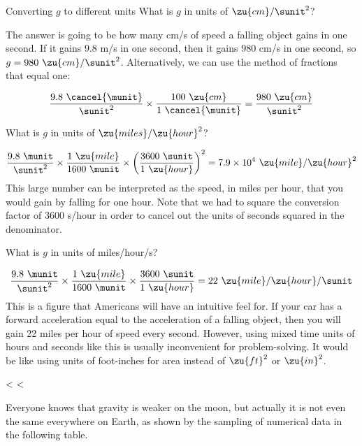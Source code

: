 \begin{eg}{Converting $g$ to different units}
\egquestion What is $g$ in units of $\zu{cm}/\sunit^2$?

\eganswer The answer is going to be how many cm/s of speed a
falling object gains in one second. If it gains 9.8 m/s in
one second, then it gains 980 cm/s in one second, so
$g=980\ \zu{cm}/\sunit^2$. Alternatively, we can use the method of
fractions that equal one:

\begin{equation*}
\frac{9.8\ \cancel{\munit}}{\sunit^2}\times\frac{100\ \zu{cm}}{1\ \cancel{\munit}}
  =\frac{980\ \zu{cm}}{\sunit^2}
\end{equation*}

\egquestion What is $g$ in units of $\zu{miles}/\zu{hour}^2$?

\eganswer

\begin{equation*}
\frac{9.8\ \munit}{\sunit^2} 
  \times \frac{1\ \zu{mile}}{1600\ \munit}
  \times \left(\frac{3600\ \sunit}{1\ \zu{hour}}\right)^2
  = 7.9\times 10^4\ \zu{mile}/\zu{hour}^2
\end{equation*}
This large number can be interpreted as the speed, in miles
per hour, that you would gain by falling for one hour. Note that
we had to square the conversion factor of 3600 s/hour in
order to cancel out the units of seconds squared in the denominator.

\egquestion What is $g$ in units of miles/hour/s?

\eganswer

\begin{equation*}
\frac{9.8\ \munit}{\sunit^2} 
  \times \frac{1\ \zu{mile}}{1600\ \munit}
  \times \frac{3600\ \sunit}{1\ \zu{hour}}
  = 22\ \zu{mile}/\zu{hour}/\sunit
\end{equation*}
This is a figure that Americans will have an intuitive feel
for. If your car has a forward acceleration equal to the
acceleration of a falling object, then you will gain 22
miles per hour of speed every second. However, using mixed
time units of hours and seconds like this is usually
inconvenient for problem-solving. It would be like using
units of foot-inches for area instead of $\zu{ft}^2$ or $\zu{in}^2$.
\end{eg}

<%
<%

Everyone knows that gravity is weaker on the moon, but
actually it is not even the same everywhere on Earth, as
shown by the sampling of numerical data in the following table.


